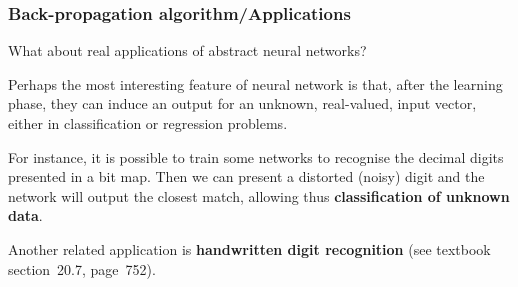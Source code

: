 %
\begin{frame}
\frametitle{Back-propagation algorithm/Applications}

What about real applications of abstract neural networks?

\bigskip

Perhaps the most interesting feature of neural network is that, after
the learning phase, they can induce an output for an unknown,
real-valued, input vector, either in classification or regression
problems.

\bigskip

For instance, it is possible to train some networks to recognise the
decimal digits presented in a bit map. Then we can present a distorted
(noisy) digit and the network will output the closest match, allowing
thus \textbf{classification of unknown data}.

\bigskip

Another related application is \textbf{handwritten digit recognition}
(see textbook section~20.7, page~752).

\end{frame}
